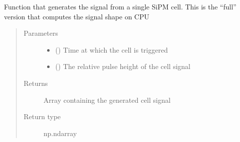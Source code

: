 \documentclass[letterpaper,10pt,english]{sphinxmanual}
\begin{document}

\begin{fulllineitems}
\label{\detokenize{structure:libs.libGPU.PulseCPU}}
Function that generates the signal from a single SiPM cell. This is the “full” version that computes the signal shape on CPU
\begin{quote}\begin{description}
\item[{Parameters}] \leavevmode\begin{itemize}
\item {} 
 () \textendash{} Time at which the cell is triggered

\item {} 
 () \textendash{} The relative pulse height of the cell signal

\end{itemize}

\item[{Returns}] \leavevmode
{} \textendash{} Array containing the generated cell signal

\item[{Return type}] \leavevmode
np.ndarray

\end{description}\end{quote}

\end{fulllineitems}

\end{document}
